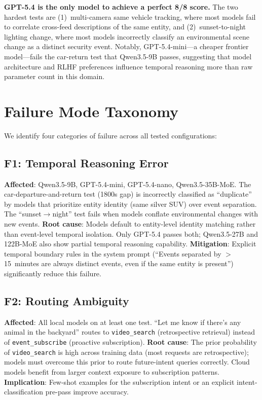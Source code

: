 \documentclass[onecolumn,10pt]{IEEEtran}
\begin{document}
\textbf{GPT-5.4 is the only model to achieve a perfect 8/8 score.}
The two hardest tests are (1)~multi-camera same vehicle tracking, where
most models fail to correlate cross-feed descriptions of the same entity,
and (2)~sunset-to-night lighting change, where most models incorrectly
classify an environmental scene change as a distinct security event.
Notably, GPT-5.4-mini---a cheaper frontier model---fails the
car-return test that Qwen3.5-9B passes, suggesting that model
architecture and RLHF preferences influence  temporal reasoning
more than raw parameter count in this domain.


\section{Failure Mode Taxonomy}

We identify four categories of failure across all tested configurations:

\subsection{F1: Temporal Reasoning Error}
\textbf{Affected}: Qwen3.5-9B, GPT-5.4-mini, GPT-5.4-nano, Qwen3.5-35B-MoE.
The car-departure-and-return test (1800s gap) is incorrectly classified
as ``duplicate'' by models that prioritize entity identity (same silver SUV)
over event separation. The ``sunset$\rightarrow$night'' test fails when
models conflate environmental changes with new events.
\textbf{Root cause}: Models default to entity-level identity matching
rather than event-level temporal isolation. Only GPT-5.4 passes both;
Qwen3.5-27B and 122B-MoE also show partial temporal reasoning capability.
\textbf{Mitigation}: Explicit temporal boundary rules in the system
prompt (``Events separated by $>$15~minutes are always distinct events,
even if the same entity is present'') significantly reduce this failure.

\subsection{F2: Routing Ambiguity}
\textbf{Affected}: All local models on at least one test.
``Let me know if there's any animal in the backyard'' routes to
\texttt{video\_search} (retrospective retrieval) instead of
\texttt{event\_subscribe} (proactive subscription).
\textbf{Root cause}: The prior probability of \texttt{video\_search}
is high across training data (most requests are retrospective); models
must overcome this prior to route future-intent queries correctly.
Cloud models benefit from larger context exposure to subscription patterns.
\textbf{Implication}: Few-shot examples for the subscription intent
or an explicit intent-classification pre-pass improve accuracy.
\end{document}
